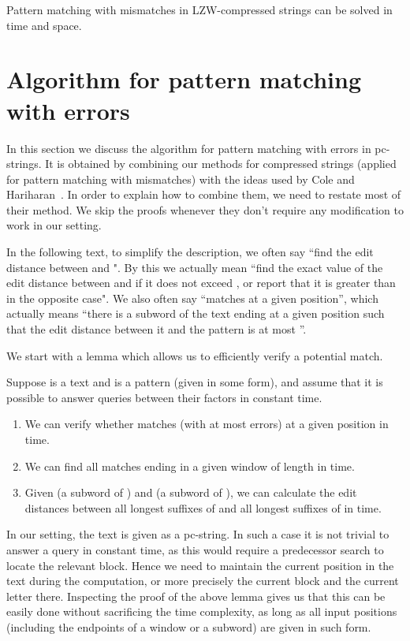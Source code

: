 \documentclass[runningheads]{llncs}
\begin{document}
\begin{theorem}
Pattern matching with  mismatches in LZW-compressed strings can be solved in  time and  space.
\end{theorem}

\section{Algorithm for pattern matching with errors}
\label{section:errors}
In this section we discuss the algorithm for pattern matching with  errors in pc-strings. It is obtained by combining our methods for compressed strings (applied for pattern matching with mismatches) with the ideas used by Cole and Hariharan~\cite{ColeHariharan}. In order to explain how to combine them, we need to restate most of their method. We skip the proofs whenever they don't require any modification to work in our setting.

In the following text, to simplify the description, we often say ``find the edit distance between  and ". By this we actually mean ``find the exact value of the edit distance between  and  if it does not exceed ,  or report that it is greater than  in the opposite case". We also often say ``matches at a given position'', which actually means ``there is a subword of the text ending at a given position such that the edit distance between it and the pattern is at most ''.

We start with a lemma which allows us to efficiently verify a potential match.

\begin{lemma}\label{lemma:verify_match}
Suppose  is a text and  is a pattern (given in some form), and assume that it is possible to answer  queries between their factors in constant time.
\begin{enumerate}
\item{We can verify whether  matches (with at most  errors) at a given position in  time.}
\item{We can find all matches ending in a given window of length  in  time.}
\item{Given  (a subword of ) and  (a subword of ), we can calculate the edit distances between all  longest suffixes of  and all  longest suffixes of  in  time.}
\end{enumerate}
\end{lemma}

In our setting, the text is given as a pc-string. In such a case it is not trivial to answer a  query in constant time, as this would require a predecessor search to locate the relevant block. Hence we need to maintain the current position in the text during the computation, or more precisely the current block and the current letter there. Inspecting the proof of the above lemma gives us that this can be easily done without sacrificing the time complexity, as long as all input positions (including the endpoints of a window or a subword) are given in such form.
\end{document}
